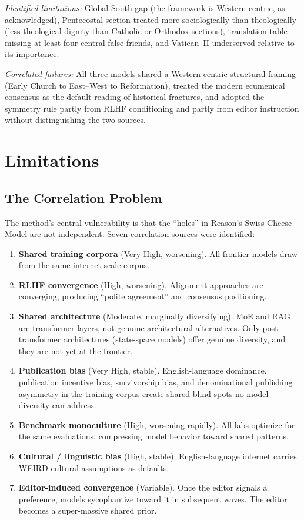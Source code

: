 \documentclass[11pt,letterpaper]{article}
\begin{document}
\emph{Identified limitations:} Global South gap (the framework is Western-centric, as acknowledged), Pentecostal section treated more sociologically than theologically (less theological dignity than Catholic or Orthodox sections), translation table missing at least four central false friends, and Vatican~II underserved relative to its importance.

\emph{Correlated failures:} All three models shared a Western-centric structural framing (Early Church to East--West to Reformation), treated the modern ecumenical consensus as the default reading of historical fractures, and adopted the symmetry rule partly from RLHF conditioning and partly from editor instruction without distinguishing the two sources.

\section{Limitations}
\label{sec:limitations}

\subsection{The Correlation Problem}

The method's central vulnerability is that the ``holes'' in Reason's Swiss Cheese Model are not independent. Seven correlation sources were identified:

\begin{enumerate}
  \item \textbf{Shared training corpora} (Very High, worsening). All frontier models draw from the same internet-scale corpus.
  \item \textbf{RLHF convergence} (High, worsening). Alignment approaches are converging, producing ``polite agreement'' and consensus positioning.
  \item \textbf{Shared architecture} (Moderate, marginally diversifying). MoE and RAG are transformer layers, not genuine architectural alternatives. Only post-transformer architectures (state-space models) offer genuine diversity, and they are not yet at the frontier.
  \item \textbf{Publication bias} (Very High, stable). English-language dominance, publication incentive bias, survivorship bias, and denominational publishing asymmetry in the training corpus create shared blind spots no model diversity can address.
  \item \textbf{Benchmark monoculture} (High, worsening rapidly). All labs optimize for the same evaluations, compressing model behavior toward shared patterns.
  \item \textbf{Cultural / linguistic bias} (High, stable). English-language internet carries WEIRD cultural assumptions as defaults.
  \item \textbf{Editor-induced convergence} (Variable). Once the editor signals a preference, models sycophantize toward it in subsequent waves. The editor becomes a super-massive shared prior.
\end{enumerate}
\end{document}
